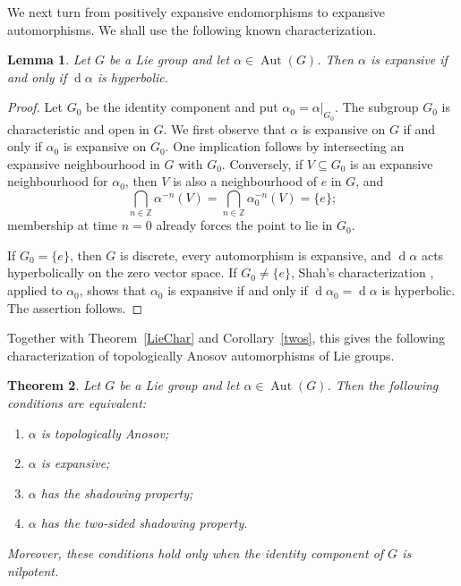 \documentclass[12pt]{amsart}
\newtheorem{theorem}{Theorem}[section]
\newtheorem{lemma}[theorem]{Lemma}
\theoremstyle{definition}
\numberwithin{equation}{section}
\theoremstyle{remark}
\DeclareMathOperator{\di}{d}
\begin{document}
We next turn from positively expansive endomorphisms to expansive
automorphisms. We shall use the following known characterization.



\begin{lemma}\label{Exp}
Let $G$ be a Lie group and let $\alpha\in\operatorname{Aut}(G)$. Then
$\alpha$ is expansive if and only if $\di\alpha$ is hyperbolic.
\end{lemma}

\begin{proof}
Let $G_0$ be the identity component and put
$\alpha_0=\alpha|_{G_0}$. The subgroup $G_0$ is characteristic and open in
$G$. We first observe that $\alpha$ is expansive on $G$ if and only if
$\alpha_0$ is expansive on $G_0$. One implication follows by intersecting
an expansive neighbourhood in $G$ with $G_0$. Conversely, if $V\subseteq
G_0$ is an expansive neighbourhood for $\alpha_0$, then $V$ is also a
neighbourhood of $e$ in $G$, and
\[
\bigcap_{n\in\mathbb Z}\alpha^{-n}(V)
=
\bigcap_{n\in\mathbb Z}\alpha_0^{-n}(V)
=\{e\};
\]
membership at time $n=0$ already forces the point to lie in $G_0$.

If $G_0=\{e\}$, then $G$ is discrete, every automorphism is expansive,
and $\di\alpha$ acts hyperbolically on the zero vector space. If
$G_0\neq\{e\}$, Shah's characterization
\cite[Proposition~2.3]{Shah2020}, applied to $\alpha_0$, shows that
$\alpha_0$ is expansive if and only if
$\di\alpha_0=\di\alpha$ is hyperbolic. The assertion follows.
\end{proof}

Together with Theorem~\ref{LieChar} and Corollary~\ref{twos}, this gives the following characterization of topologically Anosov automorphisms of Lie groups.

\begin{theorem}\label{thm:Lie-topological-Anosov}
Let $G$ be a Lie group and let $\alpha\in\operatorname{Aut}(G)$. Then the
following conditions are equivalent:
\begin{enumerate}
\item $\alpha$ is topologically Anosov;
\item $\alpha$ is expansive;
\item $\alpha$ has the shadowing property;
\item $\alpha$ has the two-sided shadowing property.
\end{enumerate}
Moreover, these conditions hold only when the identity component of $G$ is
nilpotent.
\end{theorem}
\end{document}
